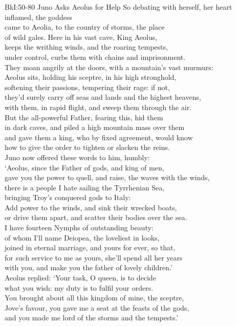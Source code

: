 \documentclass[12pt, a5paper]{letter}
\begin{document}
{BkI:50-80 Juno Asks Aeolus for Help} 
So debating with herself, her heart inflamed, the goddess\\
came to Aeolia, to the country of storms, the place\\
of wild gales. Here in his vast cave, King Aeolus,\\
keeps the writhing winds, and the roaring tempests,\\
under control, curbs them with chains and imprisonment.\\
They moan angrily at the doors, with a mountain's vast murmurs:\\
Aeolus sits, holding his sceptre, in his high stronghold,\\
softening their passions, tempering their rage: if not,\\
they'd surely carry off seas and lands and the highest heavens,\\
with them, in rapid flight, and sweep them through the air.\\
But the all-powerful Father, fearing this, hid them\\
in dark caves, and piled a high mountain mass over them\\
and gave them a king, who by fixed agreement, would know\\
how to give the order to tighten or slacken the reins.\\
Juno now offered these words to him, humbly:\\
`Aeolus, since the Father of gods, and king of men,\\
gave you the power to quell, and raise, the waves with the winds,\\
there is a people I hate sailing the Tyrrhenian Sea,\\
bringing Troy's conquered gods to Italy:\\
Add power to the winds, and sink their wrecked boats,\\
or drive them apart, and scatter their bodies over the sea.\\
I have fourteen Nymphs of outstanding beauty:\\
of whom I'll name Deiopea, the loveliest in looks,\\
joined in eternal marriage, and yours for ever, so that,\\
for such service to me as yours, she'll spend all her years\\
with you, and make you the father of lovely children.'\\
Aeolus replied: `Your task, O queen, is to decide\\
what you wish: my duty is to fulfil your orders.\\
You brought about all this kingdom of mine, the sceptre,\\
Jove's favour, you gave me a seat at the feasts of the gods,\\
and you made me lord of the storms and the tempests.'
\end{document}
